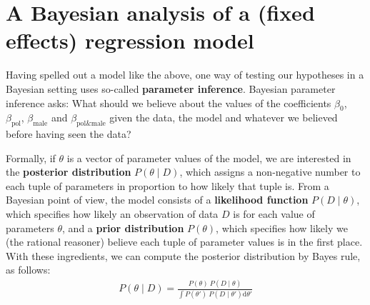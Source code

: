 \documentclass[nobib]{tufte-handout}
\begin{document}
\section{A Bayesian analysis of a (fixed effects) regression model}

Having spelled out a model like the above, one way of testing our hypotheses in a Bayesian setting uses so-called \textbf{parameter inference}.
%
%
Bayesian parameter inference asks: What should we believe about the values of the coefficients $\beta_0$, $\beta_{\text{pol}}$, $\beta_{\text{male}}$ and $\beta_{\text{pol\&male}}$ given the data, the model and whatever we believed before having seen the data?
%
%

Formally, if $\theta$ is a vector of parameter values of the model, we are interested in the \textbf{posterior distribution} $P(\theta \mid D)$, which assigns a non-negative number to each tuple of parameters in proportion to how likely that tuple is.
From a Bayesian point of view, the model consists of a \textbf{likelihood function} $P(D \mid \theta)$, which specifies how likely an observation of data $D$ is for each value of parameters $\theta$, and a \textbf{prior distribution} $P(\theta)$, which specifies how likely we (the rational reasoner) believe each tuple of parameter values is in the first place.
%
%
With these ingredients, we can compute the posterior distribution by Bayes rule, as follows:
\begin{eqnarray*}
  P(\theta \mid D) = \frac{P(\theta) \ P(D \mid \theta)}{ \int P(\theta') \ P(D \mid
  \theta') \textrm{d}\theta'}
\end{eqnarray*}

\end{document}
